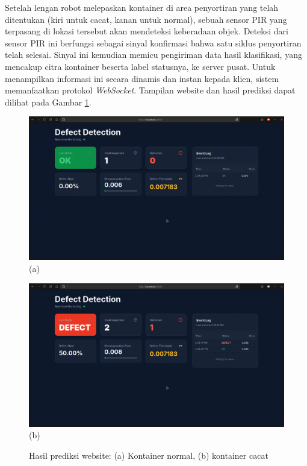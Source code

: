Setelah lengan robot melepaskan kontainer di area penyortiran yang
telah ditentukan (kiri untuk cacat, kanan untuk normal), sebuah
sensor PIR yang terpasang di lokasi tersebut akan
mendeteksi keberadaan objek. Deteksi dari sensor PIR ini berfungsi
sebagai sinyal konfirmasi bahwa satu siklus penyortiran telah
selesai. Sinyal ini kemudian memicu pengiriman data hasil
klasifikasi, yang mencakup citra kontainer beserta label statusnya,
ke server pusat. Untuk menampilkan informasi ini secara dinamis dan
instan kepada klien, sistem memanfaatkan protokol \textit{WebSocket}.
Tampilan website dan hasil prediksi dapat dilihat pada Gambar
\ref{fig:web-test}.

\begin{figure}[H]
  \centering
  \begin{minipage}{0.8\textwidth}
    \centering
    \includegraphics[width=\textwidth]{gambar/web_ss_normal.png}
    (a)
  \end{minipage}
  \vspace{1em}

  \begin{minipage}{0.8\textwidth}
    \centering
    \includegraphics[width=\textwidth]{gambar/web_ss_cacat.png}
    (b)
  \end{minipage}
  \caption{Hasil prediksi website: (a) Kontainer normal, (b) kontainer cacat}
  \label{fig:web-test}
  \vspace{-1em}
\end{figure}

